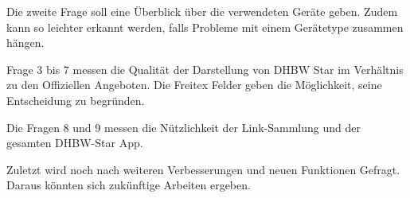 Die zweite Frage soll eine Überblick über die verwendeten Geräte geben. Zudem kann so leichter erkannt werden, falls Probleme mit einem Gerätetype zusammen hängen.

Frage 3 bis 7 messen die Qualität der Darstellung von DHBW Star im Verhältnis zu den Offiziellen Angeboten. Die Freitex Felder geben die Möglichkeit, seine Entscheidung zu begründen.

Die Fragen 8 und 9 messen die Nützlichkeit der Link-Sammlung und der gesamten DHBW-Star App.

Zuletzt wird noch nach weiteren Verbesserungen und neuen Funktionen Gefragt. Daraus könnten sich zukünftige Arbeiten ergeben.



 
